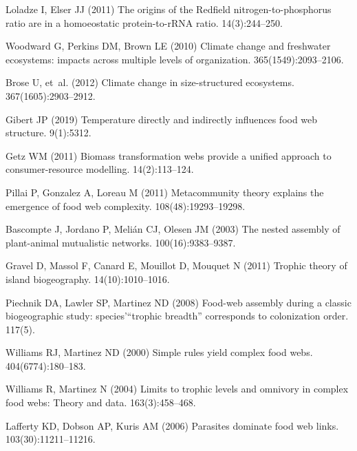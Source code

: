 \documentclass[9pt,twocolumn,twoside]{pnas-new}
\begin{document}
\begin{thebibliography}{10}
Loladze I, Elser JJ (2011) The origins of the {R}edfield nitrogen-to-phosphorus
  ratio are in a homoeostatic protein-to-r{RNA} ratio.
 14(3):244--250.

Woodward G, Perkins DM, Brown LE (2010) {Climate change and freshwater
  ecosystems: impacts across multiple levels of organization}.
 365(1549):2093--2106.

Brose U, et~al. (2012) Climate change in size-structured ecosystems.
 367(1605):2903--2912.

Gibert JP (2019) Temperature directly and indirectly influences food web
  structure.
 9(1):5312.

Getz WM (2011) {Biomass transformation webs provide a unified approach to
  consumer-resource modelling.}
 14(2):113--124.

Pillai P, Gonzalez A, Loreau M (2011) {Metacommunity theory explains the
  emergence of food web complexity.}
 108(48):19293--19298.

Bascompte J, Jordano P, Meli{\'a}n CJ, Olesen JM (2003) {The nested assembly of
  plant-animal mutualistic networks.}
 100(16):9383--9387.

Gravel D, Massol F, Canard E, Mouillot D, Mouquet N (2011) Trophic theory of
  island biogeography.
 14(10):1010--1016.

Piechnik DA, Lawler SP, Martinez ND (2008) {Food-web assembly during a classic
  biogeographic study: species'{\textquotedblleft}trophic
  breadth{\textquotedblright} corresponds to colonization order}.
 117(5).

Williams RJ, Martinez ND (2000) {Simple rules yield complex food webs}.
 404(6774):180--183.

Williams R, Martinez N (2004) Limits to trophic levels and omnivory in complex
  food webs: Theory and data.
 163(3):458--468.

Lafferty KD, Dobson AP, Kuris AM (2006) {Parasites dominate food web links.}
 103(30):11211--11216.


\end{thebibliography}
\end{document}
